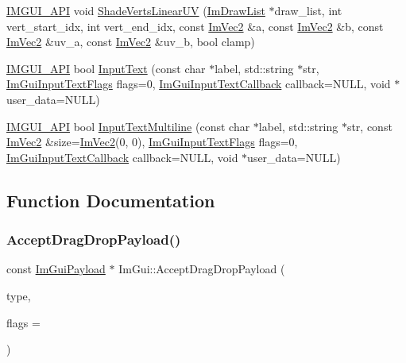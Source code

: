 \begin{DoxyCompactItemize}
\item 
\mbox{\hyperlink{imgui_8h_a43829975e84e45d1149597467a14bbf5}{I\+M\+G\+U\+I\+\_\+\+A\+PI}} void \mbox{\hyperlink{namespace_im_gui_a676637659ec4291b07f386454840b58a}{Shade\+Verts\+Linear\+UV}} (\mbox{\hyperlink{struct_im_draw_list}{Im\+Draw\+List}} $\ast$draw\+\_\+list, int vert\+\_\+start\+\_\+idx, int vert\+\_\+end\+\_\+idx, const \mbox{\hyperlink{struct_im_vec2}{Im\+Vec2}} \&a, const \mbox{\hyperlink{struct_im_vec2}{Im\+Vec2}} \&b, const \mbox{\hyperlink{struct_im_vec2}{Im\+Vec2}} \&uv\+\_\+a, const \mbox{\hyperlink{struct_im_vec2}{Im\+Vec2}} \&uv\+\_\+b, bool clamp)
\item 
\mbox{\hyperlink{imgui_8h_a43829975e84e45d1149597467a14bbf5}{I\+M\+G\+U\+I\+\_\+\+A\+PI}} bool \mbox{\hyperlink{namespace_im_gui_a1da680314eaf3f60ea2a42c76f3584b0}{Input\+Text}} (const char $\ast$label, std\+::string $\ast$str, \mbox{\hyperlink{imgui_8h_a7d2c6153a6b9b5d3178ce82434ac9fb8}{Im\+Gui\+Input\+Text\+Flags}} flags=0, \mbox{\hyperlink{imgui_8h_a65fd2b568a62c9aa2a28a8a13eb65ad7}{Im\+Gui\+Input\+Text\+Callback}} callback=N\+U\+LL, void $\ast$user\+\_\+data=N\+U\+LL)
\item 
\mbox{\hyperlink{imgui_8h_a43829975e84e45d1149597467a14bbf5}{I\+M\+G\+U\+I\+\_\+\+A\+PI}} bool \mbox{\hyperlink{namespace_im_gui_a81dd8855d2cec99457d2339498cc3c4a}{Input\+Text\+Multiline}} (const char $\ast$label, std\+::string $\ast$str, const \mbox{\hyperlink{struct_im_vec2}{Im\+Vec2}} \&size=\mbox{\hyperlink{struct_im_vec2}{Im\+Vec2}}(0, 0), \mbox{\hyperlink{imgui_8h_a7d2c6153a6b9b5d3178ce82434ac9fb8}{Im\+Gui\+Input\+Text\+Flags}} flags=0, \mbox{\hyperlink{imgui_8h_a65fd2b568a62c9aa2a28a8a13eb65ad7}{Im\+Gui\+Input\+Text\+Callback}} callback=N\+U\+LL, void $\ast$user\+\_\+data=N\+U\+LL)
\end{DoxyCompactItemize}


\subsection{Function Documentation}
\mbox{\label{namespace_im_gui_a5e0dac39e249bf50e2ae96dc4a97cb18}} 
\subsubsection{\texorpdfstring{Accept\+Drag\+Drop\+Payload()}{AcceptDragDropPayload()}}
{\footnotesize\ttfamily const \mbox{\hyperlink{struct_im_gui_payload}{Im\+Gui\+Payload}} $\ast$ Im\+Gui\+::\+Accept\+Drag\+Drop\+Payload (\begin{DoxyParamCaption}\item[{const char $\ast$}]{type,  }\item[{\mbox{\hyperlink{imgui_8h_a4e54f95ded29d2584125d116df22e430}{Im\+Gui\+Drag\+Drop\+Flags}}}]{flags = {} }\end{DoxyParamCaption})}

